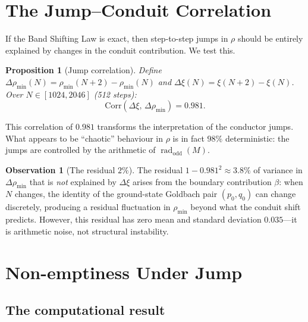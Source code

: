 \documentclass[11pt,a4paper]{article}
\newtheorem{proposition}[theorem]{Proposition}
\theoremstyle{definition}
\newtheorem{observation}[theorem]{Observation}
\DeclareMathOperator{\rad}{rad}
\begin{document}
\section{The Jump--Conduit Correlation}\label{sec:correlation}

If the Band Shifting Law is exact, then step-to-step jumps in $\rho$ should be
entirely explained by changes in the conduit contribution.  We test this.

\begin{proposition}[Jump correlation]\label{prop:corr}
  Define $\Delta\rho_{\min}(N) = \rho_{\min}(N+2) - \rho_{\min}(N)$ and
  $\Delta\xi(N) = \xi(N+2) - \xi(N)$.  Over $N \in [1024, 2046]$ (512 steps):
  \begin{equation}\label{eq:corr}
    \mathrm{Corr}(\Delta\xi,\, \Delta\rho_{\min}) = 0.981.
  \end{equation}
\end{proposition}

This correlation of $0.981$ transforms the interpretation of the conductor jumps.
What appears to be ``chaotic'' behaviour in $\rho$ is in fact $98\%$ deterministic:
the jumps are controlled by the arithmetic of $\rad_{\mathrm{odd}}(M)$.

\begin{observation}[The residual $2\%$]\label{obs:residual}
  The residual $1 - 0.981^2 \approx 3.8\%$ of variance in $\Delta\rho_{\min}$
  that is \emph{not} explained by $\Delta\xi$ arises from the boundary contribution
  $\beta$: when $N$ changes, the identity of the ground-state Goldbach pair
  $(p_0, q_0)$ can change discretely, producing a residual fluctuation in
  $\rho_{\min}$ beyond what the conduit shift predicts.  However, this residual
  has zero mean and standard deviation $0.035$---it is arithmetic noise, not
  structural instability.
\end{observation}


\section{Non-emptiness Under Jump}\label{sec:nonempty}

\subsection{The computational result}
\end{document}
